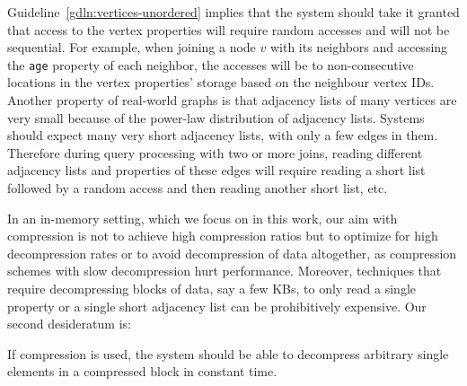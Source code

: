 \begin{guideline}
\label{gdln:fast-decompress}
Guideline~\ref{gdln:vertices-unordered} implies that the system should take it granted that access to the vertex properties will require random accesses and will not be sequential. For example, when joining a node $v$ with its neighbors and accessing the \texttt{age} property of each neighbor, the accesses will be to non-consecutive locations in the vertex properties' storage based on the neighbour vertex IDs. Another property of real-world graphs is that adjacency lists of many vertices are very small because of the power-law distribution of adjacency lists. Systems should expect many very short adjacency lists, with only a few edges in them. Therefore during query processing with two or more joins, reading different adjacency lists and properties of these edges will require reading a short list followed by a random access and then reading another short list, etc.

In an in-memory setting, which we focus on in this work, our aim with compression is not to achieve high compression ratios but to optimize for high decompression rates or to avoid decompression of data altogether, as compression schemes with slow decompression hurt performance. Moreover, techniques that require decompressing blocks of data, say a few KBs, to only read a single property or a single short adjacency list can be prohibitively expensive. Our second desideratum is:
\begin{desideratum}
\label{des:compression}
If compression is used, the system should be able to decompress arbitrary single elements in a compressed block in constant time.
\end{desideratum}  

\end{guideline}

